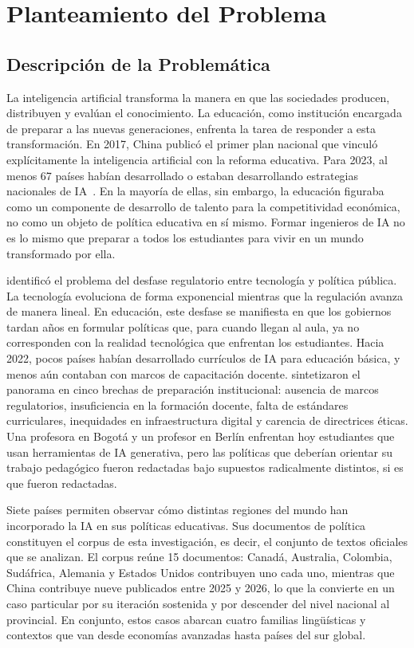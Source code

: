 \chapter{Planteamiento del Problema}
\label{cap:planteamiento}

\section{Descripción de la Problemática}

La inteligencia artificial transforma la manera en que las sociedades producen, distribuyen y evalúan el conocimiento. La educación, como institución encargada de preparar a las nuevas generaciones, enfrenta la tarea de responder a esta transformación. En 2017, China publicó el primer plan nacional que vinculó explícitamente la inteligencia artificial con la reforma educativa. Para 2023, al menos 67 países habían desarrollado o estaban desarrollando estrategias nacionales de IA~\citep{unesco2023genai}. En la mayoría de ellas, sin embargo, la educación figuraba como un componente de desarrollo de talento para la competitividad económica, no como un objeto de política educativa en sí mismo. Formar ingenieros de IA no es lo mismo que preparar a todos los estudiantes para vivir en un mundo transformado por ella.

\citet{thierer2018pacing} identificó el problema del desfase regulatorio entre tecnología y política pública. La tecnología evoluciona de forma exponencial mientras que la regulación avanza de manera lineal. En educación, este desfase se manifiesta en que los gobiernos tardan años en formular políticas que, para cuando llegan al aula, ya no corresponden con la realidad tecnológica que enfrentan los estudiantes. Hacia 2022, pocos países habían desarrollado currículos de IA para educación básica, y menos aún contaban con marcos de capacitación docente. \citet{miao2021guidance} sintetizaron el panorama en cinco brechas de preparación institucional: ausencia de marcos regulatorios, insuficiencia en la formación docente, falta de estándares curriculares, inequidades en infraestructura digital y carencia de directrices éticas. Una profesora en Bogotá y un profesor en Berlín enfrentan hoy estudiantes que usan herramientas de IA generativa, pero las políticas que deberían orientar su trabajo pedagógico fueron redactadas bajo supuestos radicalmente distintos, si es que fueron redactadas.

Siete países permiten observar cómo distintas regiones del mundo han incorporado la IA en sus políticas educativas. Sus documentos de política constituyen el corpus de esta investigación, es decir, el conjunto de textos oficiales que se analizan. El corpus reúne 15 documentos: Canadá, Australia, Colombia, Sudáfrica, Alemania y Estados Unidos contribuyen uno cada uno, mientras que China contribuye nueve publicados entre 2025 y 2026, lo que la convierte en un caso particular por su iteración sostenida y por descender del nivel nacional al provincial. En conjunto, estos casos abarcan cuatro familias lingüísticas y contextos que van desde economías avanzadas hasta países del sur global.

